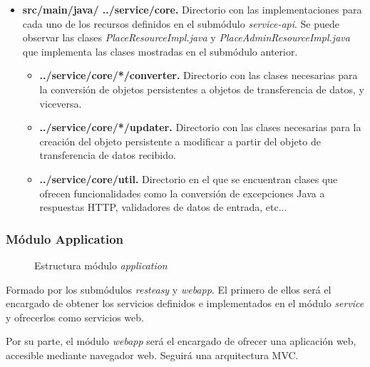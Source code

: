 \begin{itemize}
	\item \textbf{src/main/java/ ../service/core. } Directorio con las implementaciones para cada uno de los recursos definidos en el submódulo \textit{service-api}. Se puede observar las clases \textit{PlaceResourceImpl.java} y \textit{PlaceAdminResourceImpl.java} que implementa las clases mostradas en el submódulo anterior.
	\begin{itemize}
		\item \textbf{../service/core/*/converter. } Directorio con las clases necesarias para la conversión de objetos persistentes a objetos de transferencia de datos, y viceversa.
		\item \textbf{../service/core/*/updater. } Directorio con las clases necesarias para la creación del objeto persistente a modificar a partir del objeto de transferencia de datos recibido. 
		\item \textbf{../service/core/util. } Directorio en el que se encuentran clases que ofrecen funcionalidades como la conversión de excepciones Java a respuestas HTTP, validadores de datos de entrada, etc...
	\end{itemize}
\end{itemize}



\subsubsection*{Módulo Application}
\begin{figure}[H]
\centering
{}
\caption{Estructura módulo \textit{application}}
\end{figure}

Formado por los submódulos \textit{resteasy} y \textit{webapp}. El primero de ellos será el encargado de obtener los servicios definidos e implementados en el módulo \textit{service} y ofrecerlos como servicios web. 

Por su parte, el módulo \textit{webapp} será el encargado de ofrecer una aplicación web, accesible mediante navegador web. Seguirá una arquitectura MVC.


